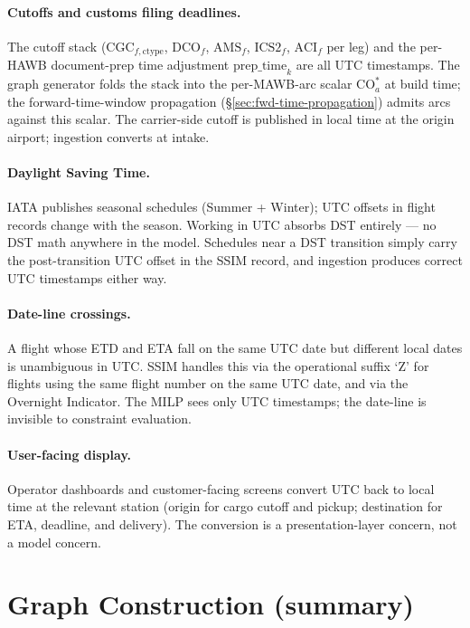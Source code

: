 \documentclass[11pt,a4paper]{article}
\newcommand{\ctype}{\text{ctype}}
\theoremstyle{definition}
\begin{document}
\paragraph{Cutoffs and customs filing deadlines.}
The cutoff stack ($\text{CGC}_{f,\ctype}$, $\text{DCO}_f$, $\text{AMS}_f$,
$\text{ICS2}_f$, $\text{ACI}_f$ per leg) and the per-HAWB document-prep time
adjustment $\text{prep\_time}_k$ are all UTC timestamps. The graph generator
folds the stack into the per-MAWB-arc scalar $\text{CO}_a^*$ at build time;
the forward-time-window propagation (\S\ref{sec:fwd-time-propagation})
admits arcs against this scalar. The carrier-side cutoff is published in
local time at the origin airport; ingestion converts at intake.

\paragraph{Daylight Saving Time.}
IATA publishes seasonal schedules (Summer + Winter); UTC offsets in flight
records change with the season. Working in UTC absorbs DST entirely --- no DST
math anywhere in the model. Schedules near a DST transition simply carry the
post-transition UTC offset in the SSIM record, and ingestion produces correct
UTC timestamps either way.

\paragraph{Date-line crossings.}
A flight whose ETD and ETA fall on the same UTC date but different local dates
is unambiguous in UTC. SSIM handles this via the operational suffix `Z' for
flights using the same flight number on the same UTC date, and via the
Overnight Indicator. The MILP sees only UTC timestamps; the date-line is
invisible to constraint evaluation.

\paragraph{User-facing display.}
Operator dashboards and customer-facing screens convert UTC back to local time
at the relevant station (origin for cargo cutoff and pickup; destination for
ETA, deadline, and delivery). The conversion is a presentation-layer concern,
not a model concern.

\section{Graph Construction (summary)}
\label{sec:graph-construction}
\end{document}
